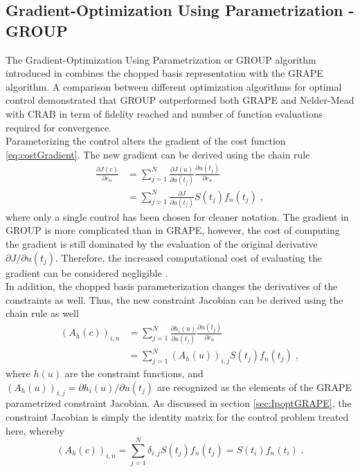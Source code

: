 \subsection{Gradient-Optimization Using Parametrization - GROUP}
The Gradient-Optimization Using Parametrization or \textsc{GROUP} algorithm introduced in \cite{sorensen2018} combines the chopped basis representation with the \textsc{GRAPE} algorithm. A comparison between different optimization algorithms for optimal control demonstrated that \textsc{GROUP} outperformed both \textsc{GRAPE} and Nelder-Mead with \textsc{CRAB} in term of fidelity reached and number of function evaluations required for convergence. \\
Parameterizing the control alters the gradient of the cost function \eqref{eq:costGradient}. The new gradient can be derived using the chain rule
\begin{align}
	\frac{\partial J (c)}{\partial c_n} &= \sum_{j = 1}^{N} \frac{\partial J (u)}{\partial u(t_j)} \frac{\partial u(t_j)}{\partial c_n} \nonumber \\
	&= \sum_{j = 1}^{N} \frac{\partial J }{\partial u(t_j)} S(t_j) f_n(t_j) \; , \label{eq:GROUPgradient} 
\end{align}
where only a single control has been chosen for cleaner notation. The gradient in \textsc{GROUP} is more complicated than in \textsc{GRAPE}, however, the cost of computing the gradient is still dominated by the evaluation of the original derivative ${\partial J }/{\partial u(t_j)}$. Therefore, the increased computational cost of evaluating the gradient can be considered negligible \cite{sorensen2018}.\\
In addition, the chopped basis parameterization changes the derivatives of the constraints as well. Thus, the new constraint Jacobian can be derived using the chain rule as well
\begin{align}
	(A_h (c))_{i,n}  &= \sum_{j = 1}^{N} \frac{\partial h_i (u ) }{\partial u(t_j)} \frac{\partial u(t_j)}{\partial c_n} \nonumber \\
	&= \sum_{j = 1}^{N} (A_h (u))_{i,j} S(t_j) f_n (t_j) \; , \label{eq:GROUPconstJacobian} 
\end{align}
where $h(u)$ are the constraint functions, and $(A_h (u))_{i,j} = {\partial h_i (u ) } / {\partial u(t_j)}$ are recognized as the elements of the GRAPE parametrized constraint Jacobian. As discussed in section \ref{sec:IpoptGRAPE}, the constraint Jacobian is simply the identity matrix for the control problem treated here, whereby 
\begin{equation}
	(A_h (c))_{i,n} = \sum_{j = 1}^{N} \delta_{i,j} S(t_j) f_n (t_j) = S(t_i) f_n (t_i) \; .
\end{equation} 
